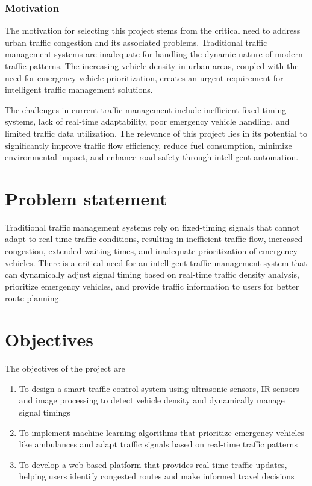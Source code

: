 \documentclass[12pt]{report}
\begin{document}
\subsubsection[Motivation]{\textbf{Motivation}}

The motivation for selecting this project stems from the critical need to address urban traffic congestion and its associated problems. Traditional traffic management systems are inadequate for handling the dynamic nature of modern traffic patterns. The increasing vehicle density in urban areas, coupled with the need for emergency vehicle prioritization, creates an urgent requirement for intelligent traffic management solutions.

The challenges in current traffic management include inefficient fixed-timing systems, lack of real-time adaptability, poor emergency vehicle handling, and limited traffic data utilization. The relevance of this project lies in its potential to significantly improve traffic flow efficiency, reduce fuel consumption, minimize environmental impact, and enhance road safety through intelligent automation.

\section[Problem statement]{\textbf{Problem statement}}

Traditional traffic management systems rely on fixed-timing signals that cannot adapt to real-time traffic conditions, resulting in inefficient traffic flow, increased congestion, extended waiting times, and inadequate prioritization of emergency vehicles. There is a critical need for an intelligent traffic management system that can dynamically adjust signal timing based on real-time traffic density analysis, prioritize emergency vehicles, and provide traffic information to users for better route planning.

\section[Objectives]{\textbf{Objectives}}
The objectives of the project are
\begin{enumerate}
\item To design a smart traffic control system using ultrasonic sensors, IR sensors and image processing to detect vehicle density and dynamically manage signal timings
\item To implement machine learning algorithms that prioritize emergency vehicles like ambulances and adapt traffic signals based on real-time traffic patterns
\item To develop a web-based platform that provides real-time traffic updates, helping users identify congested routes and make informed travel decisions
\end{enumerate}
\end{document}
